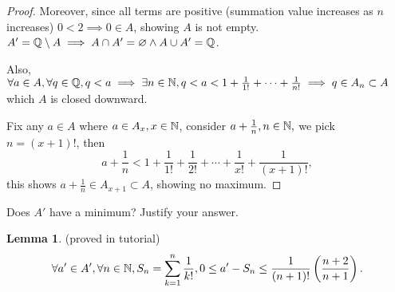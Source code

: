 \documentclass{homework}
\newcommand{\nil}{\varnothing}
\newcommand{\Q}{\bb{Q}} %
\newcommand{\N}{\bb{N}} %
\newcommand{\?}{\stackrel{?}{=}}
\theoremstyle{definition}
\newtheorem{lemma}{Lemma}
\begin{document}
\begin{proof}
Moreover, since all terms are positive (summation value increases as $n$ increases) $0<2\implies0\in A$, showing $A$ is not empty. $A'=\Q\setminus A\implies A\cap A'=\nil\land A\cup A'=\Q$. 

Also,  $\forall a\in A,\forall q\in\Q, q<a\implies \exists n\in\N, q<a<1+\frac1{1!}+\cdots+\frac1{n!}\implies q\in A_n\subset A$ which $A$ is closed downward. 

Fix any $a\in A$ where $a\in A_x, x\in\N$, consider $a+\frac1n, n\in\N,$ we pick $n=(x+1)!$, then $$a+\frac1n<1+\frac1{1!}+\frac1{2!}+\cdots+\frac{1}{x!}+\frac{1}{(x+1)!},$$ this shows $a+\frac1n\in A_{x+1}\subset A$, showing no maximum. 
\end{proof}

\question[2] Does $A'$ have a minimum? Justify your answer.
\begin{lemma}
    (proved in tutorial)
    $$ \forall a'\in A', \forall n\in\N, S_n=\sum\limits_{k=1}^n\frac{1}{k!}, 0\leq a'-S_n\leq\frac{1}{(n+1)!}\left(\frac{n+2}{n+1}\right).$$



        

\end{lemma}
\end{document}
